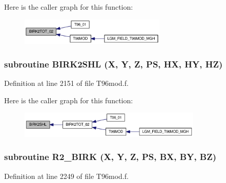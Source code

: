 Here is the caller graph for this function:\nopagebreak
\begin{figure}[H]
\begin{center}
\leavevmode
\includegraphics[width=197pt]{_t96mod_8f_72d9123c4c7f8cc57e525a533b45d5fe_icgraph}
\end{center}
\end{figure}
\hypertarget{_t96mod_8f_09ee39e02874a680b5fe915e9ccbc8f6}{
\subsubsection[{BIRK2SHL}]{\setlength{\rightskip}{0pt plus 5cm}subroutine BIRK2SHL (X, \/  Y, \/  Z, \/  PS, \/  HX, \/  HY, \/  HZ)}}
\label{_t96mod_8f_09ee39e02874a680b5fe915e9ccbc8f6}




Definition at line 2151 of file T96mod.f.

Here is the caller graph for this function:\nopagebreak
\begin{figure}[H]
\begin{center}
\leavevmode
\includegraphics[width=247pt]{_t96mod_8f_09ee39e02874a680b5fe915e9ccbc8f6_icgraph}
\end{center}
\end{figure}
\hypertarget{_t96mod_8f_75644447b8b698b1ea33e1bc67aba7af}{
\subsubsection[{R2\_\-BIRK}]{\setlength{\rightskip}{0pt plus 5cm}subroutine R2\_\-BIRK (X, \/  Y, \/  Z, \/  PS, \/  BX, \/  BY, \/  BZ)}}
\label{_t96mod_8f_75644447b8b698b1ea33e1bc67aba7af}




Definition at line 2249 of file T96mod.f.

